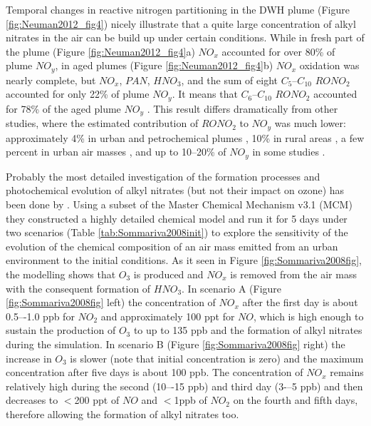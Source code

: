 \documentclass[11pt,a4paper]{article}
\begin{document}
Temporal changes in reactive nitrogen partitioning in the DWH plume (Figure \ref{fig:Neuman2012_fig4}) nicely illustrate that a quite large concentration of alkyl nitrates in the air can be build up under certain conditions. While in fresh part of the plume (Figure \ref{fig:Neuman2012_fig4}a) $NO_x$ accounted for over 80\% of plume $NO_y$, in aged plumes (Figure \ref{fig:Neuman2012_fig4}b) $NO_x$ oxidation was nearly complete, but $NO_x$, $PAN$, $HNO_3$, and the sum of eight $C_5$–$C_{10}$ $RONO_2$ accounted for only 22\% of plume $NO_y$. It means that $C_6$–$C_{10}$ $RONO_2$ accounted for 78\% of the aged plume $NO_y$ \citep{Neuman2012}. This result differs dramatically from other studies, where the estimated contribution of $RONO_2$ to $NO_y$ was much lower: approximately 4\% in urban and petrochemical plumes \citep{Ryerson2003}, 10\% in rural areas \citep{Parrish1993}, a few percent in urban air masses \citep{Ryerson2003}, and up to 10–20\% of $NO_y$ in some studies \citep{Day2003}.

Probably the most detailed investigation of the formation processes and photochemical evolution of alkyl nitrates (but not their impact on ozone) has been done by \cite{Sommariva2008}. Using a subset of the Master Chemical Mechanism v3.1 (MCM) they constructed a highly detailed chemical model and run it for 5 days under two scenarios (Table \ref{tab:Sommariva2008init}) to explore the sensitivity of the evolution of the chemical composition of an air mass emitted from an urban environment to the initial conditions. As it seen in Figure \ref{fig:Sommariva2008fig}, the modelling shows that $O_3$ is produced and $NO_x$ is removed from the air mass with the consequent formation of $HNO_3$. In scenario A (Figure \ref{fig:Sommariva2008fig} left) the concentration of $NO_x$ after the first day is about 0.5–-1.0 ppb for $NO_2$ and approximately 100 ppt for $NO$, which is high enough to sustain the production of $O_3$ to up to 135 ppb and the formation of alkyl nitrates during the simulation. In scenario B (Figure \ref{fig:Sommariva2008fig} right) the increase in $O_3$ is slower (note that initial concentration is zero) and the maximum concentration after five days is about 100 ppb. The concentration of $NO_x$ remains relatively high during the second (10–-15 ppb) and third day (3-–5 ppb) and then decreases to $<$200 ppt of $NO$ and $<$1ppb of $NO_2$ on the fourth and fifth days, therefore allowing the formation of alkyl nitrates too. 
\end{document}
